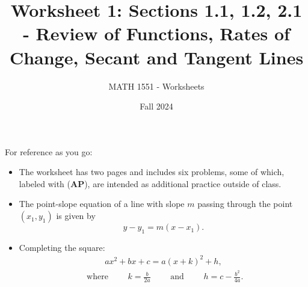 \documentclass{article}
\title{Worksheet 1: Sections 1.1, 1.2, 2.1 - Review of Functions, Rates of Change, Secant and Tangent
Lines
}
\author{MATH 1551 - Worksheets}
\date{Fall 2024}
\newcommand{\<}{\langle}
\renewcommand{\>}{\rangle}
\begin{document}
\maketitle

For reference as you go:



\begin{itemize}

\item [a)] The worksheet has two pages and includes six problems, some of which, labeled with (\textbf{AP}), are intended as additional practice outside of class.\medskip
\item[b)] The point-slope equation of a line with slope $m$ passing through the point $(x_1,y_1)$ is given by 
$$y-y_1 = m(x-x_1).$$

\item[c)] Completing the square:
\begin{align*}
    ax^2+bx+c = a(x+k)^2+h,
\end{align*}
    \begin{align*}
 \mbox{ where } \qquad   k= \frac{b}{2a} \qquad \mbox { and } \qquad 
    h=c-\frac{b^2}{4a}.
\end{align*}
    

\end{itemize}
\end{document}
